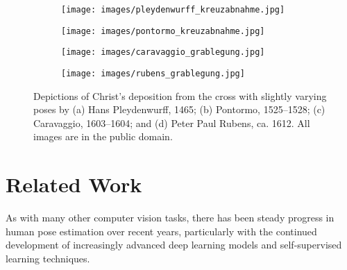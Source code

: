 \documentclass[sigconf]{acmart}
\begin{document}
\begin{figure*}
\centering
\begin{subfigure}{.247\textwidth}
  \centering
  \texttt{[image: images/pleydenwurff\_kreuzabnahme.jpg]}
  \caption{}
\end{subfigure}\hfill
\begin{subfigure}{.247\textwidth}
  \centering
  \texttt{[image: images/pontormo\_kreuzabnahme.jpg]}
  \caption{}
  \label{fig:deposition-pontormo}
\end{subfigure}\hfill
\begin{subfigure}{.247\textwidth}
  \centering
  \texttt{[image: images/caravaggio\_grablegung.jpg]}
  \caption{}
\end{subfigure}\hfill
\begin{subfigure}{.247\textwidth}
  \centering
  \texttt{[image: images/rubens\_grablegung.jpg]}
  \caption{}
\end{subfigure}\caption{Depictions of Christ's deposition from the cross  with slightly varying poses by (a) Hans Pleydenwurff, 1465; (b) Pontormo, 1525--1528; (c) Caravaggio, 1603--1604; and (d) Peter Paul Rubens, ca. 1612. All images are in the public domain.
\vspace{4pt}
}
\label{fig:deposition}
\end{figure*}


\section{Related Work}
\label{sec:rw}

As with many other computer vision tasks, there has been steady progress in human pose estimation over recent years, particularly with the continued development of increasingly advanced deep learning models and self-supervised learning techniques.
\end{document}
